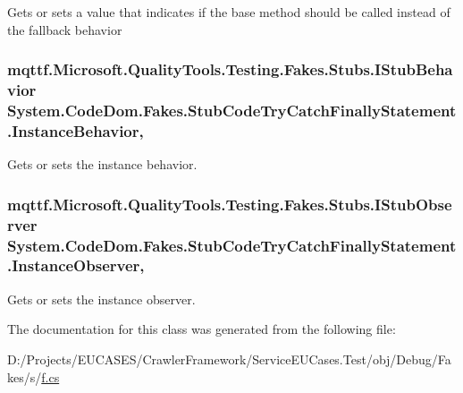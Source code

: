 Gets or sets a value that indicates if the base method should be called instead of the fallback behavior

\hypertarget{class_system_1_1_code_dom_1_1_fakes_1_1_stub_code_try_catch_finally_statement_a7ef342185f031815100e43fdbd23acc9}{
\subsubsection[{Instance\-Behavior}]{\setlength{\rightskip}{0pt plus 5cm}mqttf.\-Microsoft.\-Quality\-Tools.\-Testing.\-Fakes.\-Stubs.\-I\-Stub\-Behavior System.\-Code\-Dom.\-Fakes.\-Stub\-Code\-Try\-Catch\-Finally\-Statement.\-Instance\-Behavior\hspace{0.3cm}{\ttfamily [get]}, {\ttfamily [set]}}}\label{class_system_1_1_code_dom_1_1_fakes_1_1_stub_code_try_catch_finally_statement_a7ef342185f031815100e43fdbd23acc9}


Gets or sets the instance behavior.

\hypertarget{class_system_1_1_code_dom_1_1_fakes_1_1_stub_code_try_catch_finally_statement_a76e5cf96f31fd5a412ba71cbc53fcb2b}{
\subsubsection[{Instance\-Observer}]{\setlength{\rightskip}{0pt plus 5cm}mqttf.\-Microsoft.\-Quality\-Tools.\-Testing.\-Fakes.\-Stubs.\-I\-Stub\-Observer System.\-Code\-Dom.\-Fakes.\-Stub\-Code\-Try\-Catch\-Finally\-Statement.\-Instance\-Observer\hspace{0.3cm}{\ttfamily [get]}, {\ttfamily [set]}}}\label{class_system_1_1_code_dom_1_1_fakes_1_1_stub_code_try_catch_finally_statement_a76e5cf96f31fd5a412ba71cbc53fcb2b}


Gets or sets the instance observer.



The documentation for this class was generated from the following file\-:\begin{DoxyCompactItemize}
\item 
D\-:/\-Projects/\-E\-U\-C\-A\-S\-E\-S/\-Crawler\-Framework/\-Service\-E\-U\-Cases.\-Test/obj/\-Debug/\-Fakes/s/\hyperlink{s_2f_8cs}{f.\-cs}\end{DoxyCompactItemize}
